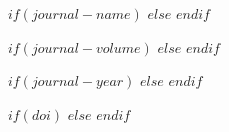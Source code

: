 $if(journal-name)$
$else$
$endif$

$if(journal-volume)$
$else$
$endif$

$if(journal-year)$
$else$
$endif$

$if(doi)$
$else$
$endif$
